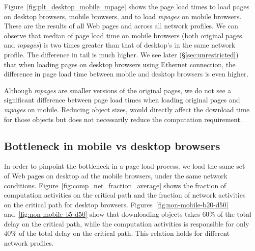 Figure~\ref{fig:plt_desktop_mobile_mpage} shows the page load times to load pages on desktop browsers, mobile browsers, and to load {\em mpages} on mobile browsers. These are the results of all Web pages and across all network profiles. We can observe that median of page load time on mobile browsers (both original pages and {\em mpages}) is two times greater than that of desktop's in the same network profile.
The difference in tail is much higher. We see later (\S\ref{sec:unrestricted}) that when loading pages on desktop browsers using Ethernet connection, the difference in page load time between mobile and desktop browsers is even higher.

\begin{figure}[!htb]
\end{figure}

\noindent Although {\em mpages} are smaller versions of the original pages, we do not see a significant difference between page load times when loading original pages and {\em mpages} on mobile. Reducing object sizes, would directly affect the download time for those objects but does not necessarily reduce the computation requirement. %

\subsection{Bottleneck in mobile vs desktop browsers}
In order to pinpoint the bottleneck in a page load process, we load the same set of Web pages on desktop ad the mobile browsers, under the same network conditions.
Figure~\ref{fig:comp_net_fraction_average} shows the fraction of computation activities on the critical path and the fraction of network activities on the critical path for desktop browsers. Figures~\ref{fig:non-mobile-b20-d50} and~\ref{fig:non-mobile-b5-d50} show that downloading objects takes 60\% of the total delay on the critical path, while the computation activities is responsible for only  40\% of the total delay on the critical path. This relation holds for different network profiles.

